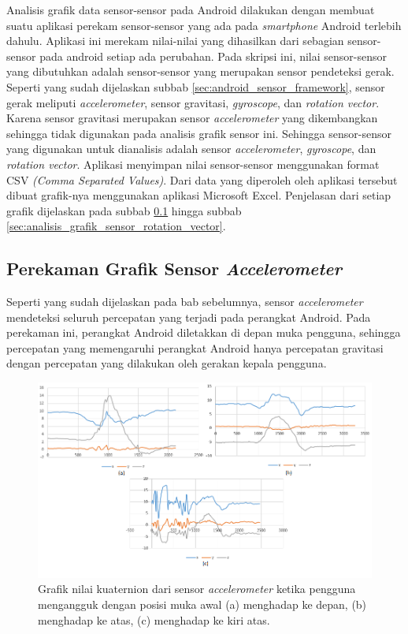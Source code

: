 Analisis grafik data sensor-sensor pada Android dilakukan dengan membuat suatu aplikasi perekam sensor-sensor yang ada pada \textit{smartphone} Android terlebih dahulu. Aplikasi ini merekam nilai-nilai yang dihasilkan dari sebagian sensor-sensor pada android setiap ada perubahan. Pada skripsi ini, nilai sensor-sensor yang dibutuhkan adalah sensor-sensor yang merupakan sensor pendeteksi gerak. Seperti yang sudah dijelaskan subbab \ref{sec:android_sensor_framework}, sensor gerak meliputi \textit{accelerometer}, sensor gravitasi, \textit{gyroscope}, dan \textit{rotation vector}. Karena sensor gravitasi merupakan sensor \textit{accelerometer} yang dikembangkan sehingga tidak digunakan pada analisis grafik sensor ini. Sehingga sensor-sensor yang digunakan untuk dianalisis adalah sensor \textit{accelerometer}, \textit{gyroscope}, dan \textit{rotation vector}. Aplikasi menyimpan nilai sensor-sensor menggunakan format CSV \textit{(Comma Separated Values)}. Dari data yang diperoleh oleh aplikasi tersebut dibuat grafik-nya menggunakan aplikasi Microsoft Excel. Penjelasan dari setiap grafik dijelaskan pada subbab \ref{sec:analisis_grafik_sensor_accelerometer} hingga subbab \ref{sec:analisis_grafik_sensor_rotation_vector}.

\subsection{Perekaman Grafik Sensor \textit{Accelerometer}}
\label{sec:analisis_grafik_sensor_accelerometer}

Seperti yang sudah dijelaskan pada bab sebelumnya, sensor \textit{accelerometer} mendeteksi seluruh percepatan yang terjadi pada perangkat Android. Pada perekaman ini, perangkat Android diletakkan di depan muka pengguna, sehingga percepatan yang memengaruhi perangkat Android hanya percepatan gravitasi dengan percepatan yang dilakukan oleh gerakan kepala pengguna. 

\begin{figure}[htbp]
\centering
\includegraphics[scale=0.6]{Gambar/grafik-sensor-accelerometer-mengangguk.png}
\caption{Grafik nilai kuaternion dari sensor \textit{accelerometer} ketika pengguna mengangguk dengan posisi muka awal (a) menghadap ke depan, (b) menghadap ke atas, (c) menghadap ke kiri atas.} 
\label{fig:grafik-sensor-accelerometer-mengangguk}
\end{figure}

